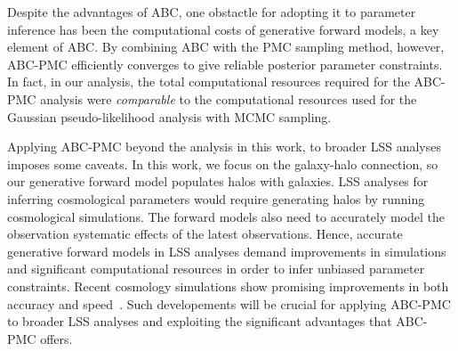 
Despite the advantages of ABC, one obstactle for adopting it to parameter 
inference has been the computational costs of generative forward models, a 
key element of ABC. By combining ABC with the PMC sampling method, however, 
ABC-PMC efficiently converges to give reliable posterior parameter constraints. 
In fact, in our analysis, the total computational resources required for the 
ABC-PMC analysis were {\em comparable} to the computational resources used 
for the Gaussian pseudo-likelihood analysis with MCMC sampling.


Applying ABC-PMC beyond the analysis in this work, to broader LSS analyses 
imposes some caveats. In this work, we focus on the galaxy-halo connection, so
our generative forward model populates halos with galaxies. LSS analyses 
for inferring cosmological parameters would require generating halos by 
running cosmological simulations. The forward models also need to accurately 
model the observation systematic effects of the latest observations. Hence, 
accurate generative forward models in LSS analyses demand improvements in simulations 
and significant computational resources in order to infer unbiased parameter 
constraints. Recent cosmology simulations show promising improvements 
in both accuracy and speed~\citep[\emph{e.g.}][]{fastpm}. Such developements
will be crucial for applying ABC-PMC to broader LSS analyses and exploiting 
the significant advantages that ABC-PMC offers.


